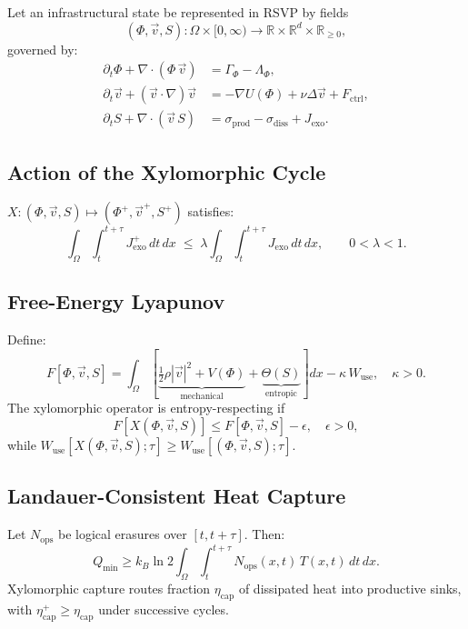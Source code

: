 \documentclass[11pt,a4paper]{article}
\theoremstyle{plain}
\theoremstyle{definition}
\theoremstyle{remark}
\begin{document}
Let an infrastructural state be represented in RSVP by fields
\[
  (\Phi,\vec{v},S) : \Omega \times [0,\infty)
  \to \mathbb{R} \times \mathbb{R}^d \times \mathbb{R}_{\geq 0},
\]
governed by:
\begin{align}
  \partial_t \Phi + \nabla \cdot (\Phi\,\vec{v}) &= \Gamma_\Phi - \Lambda_\Phi, \\
  \partial_t \vec{v} + (\vec{v}\cdot\nabla)\vec{v}
    &= -\nabla U(\Phi) + \nu\Delta\vec{v} + F_{\mathrm{ctrl}}, \\
  \partial_t S + \nabla\cdot(\vec{v}\,S)
    &= \sigma_{\mathrm{prod}} - \sigma_{\mathrm{diss}} + J_{\mathrm{exo}}.
\end{align}

\subsection{Action of the Xylomorphic Cycle}

$X : (\Phi,\vec{v},S) \mapsto (\Phi^+,\vec{v}^+,S^+)$ satisfies:
\[
  \int_\Omega\int_t^{t+\tau} J^+_{\mathrm{exo}}\,dt\,dx
  \;\leq\;
  \lambda \int_\Omega\int_t^{t+\tau} J_{\mathrm{exo}}\,dt\,dx,
  \qquad 0 < \lambda < 1.
\]

\subsection{Free-Energy Lyapunov}

Define:
\[
  F[\Phi,\vec{v},S]
  = \int_\Omega\!\left[
      \underbrace{\tfrac12\rho|\vec{v}|^2 + V(\Phi)}_{\text{mechanical}}
      + \underbrace{\Theta(S)}_{\text{entropic}}
    \right]dx
  - \kappa\,W_{\mathrm{use}},
  \quad \kappa > 0.
\]
The xylomorphic operator is entropy-respecting if
\[
  F[X(\Phi,\vec{v},S)] \leq F[\Phi,\vec{v},S] - \epsilon, \quad \epsilon>0,
\]
while $W_{\mathrm{use}}[X(\Phi,\vec{v},S);\tau] \geq W_{\mathrm{use}}[(\Phi,\vec{v},S);\tau]$.

\subsection{Landauer-Consistent Heat Capture}

Let $N_{\mathrm{ops}}$ be logical erasures over $[t,t+\tau]$. Then:
\[
  Q_{\mathrm{min}} \geq k_B \ln 2
  \int_\Omega\int_t^{t+\tau} N_{\mathrm{ops}}(x,t)\,T(x,t)\,dt\,dx.
\]
Xylomorphic capture routes fraction $\eta_{\mathrm{cap}}$ of dissipated heat
into productive sinks, with $\eta^+_{\mathrm{cap}} \geq \eta_{\mathrm{cap}}$
under successive cycles.
\end{document}
